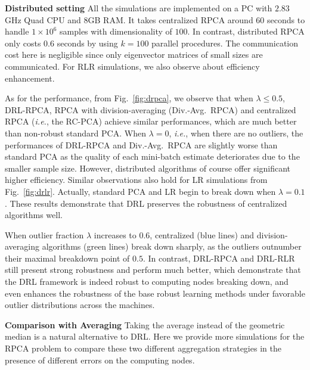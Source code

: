 \documentclass[11pt]{article}
\begin{document}
\textbf{Distributed setting} All the simulations are implemented on a PC with $2.83$GHz Quad CPU and $8$GB RAM. It takes centralized RPCA around $60$ seconds to handle $1\times 10^6$ samples with dimensionality of $100$. In contrast, distributed RPCA only costs $0.6$ seconds by using $k=100$ parallel procedures.
The communication cost here is negligible since only eigenvector matrices of small sizes are communicated. For RLR simulations, we also observe about efficiency  enhancement. 

As for the performance, from Fig.~\ref{fig:drpca}, we observe that when $\lambda \leq 0.5$, DRL-RPCA, RPCA with division-averaging (Div.-Avg.\ RPCA) and centralized RPCA (\emph{i.e.}, the RC-PCA) achieve similar performances, which are much better than non-robust standard PCA. When $ \lambda = 0 $, \emph{i.e.}, when there are no outliers, the performances of DRL-RPCA and Div.-Avg.\ RPCA are slightly worse than standard PCA as the  quality of each mini-batch estimate deteriorates  due to the smaller sample size. However, distributed algorithms of course offer significant higher efficiency. Similar observations also hold for LR simulations from Fig.~\ref{fig:drlr}. Actually, standard PCA and LR begin to break down when $\lambda =0.1$. These results demonstrate that DRL preserves the robustness of centralized algorithms well. 

When outlier fraction $\lambda$ increases to $0.6$, centralized  (blue lines) and division-averaging algorithms (green lines) break down sharply, as the outliers outnumber their maximal breakdown point of $0.5$. In contrast, DRL-RPCA and DRL-RLR still present strong robustness and perform much better, which demonstrate that the DRL framework is indeed robust to computing nodes breaking down, and even enhances the robustness of the base robust learning methods under favorable outlier distributions across the machines.

\textbf{Comparison with Averaging}
Taking the average instead of the geometric median is a natural alternative to DRL. Here we provide more simulations for the  RPCA problem  to compare these two different aggregation strategies in the presence of different errors on the computing nodes.
\end{document}
